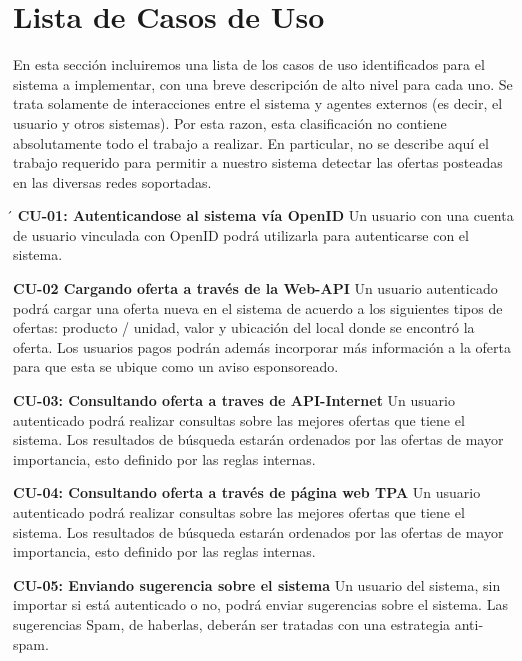 \section*{Lista de Casos de Uso}
 En esta sección incluiremos una lista de los casos de uso identificados para el sistema a implementar, con una breve descripción de alto nivel para cada uno. Se trata solamente de interacciones entre el sistema y agentes externos (es decir, el usuario y otros sistemas). Por esta razon, esta clasificación no contiene absolutamente todo el trabajo a realizar.  
    En particular, no se describe aquí el trabajo requerido para permitir a nuestro sistema detectar las ofertas posteadas en las diversas redes soportadas. 


 ́ 
\textbf{CU-01: Autenticandose al sistema vía OpenID} Un usuario con una cuenta de usuario vinculada con OpenID podrá utilizarla para autenticarse con el sistema.

\textbf{CU-02 Cargando oferta a través de la Web-API} Un usuario autenticado podrá cargar una oferta nueva en el sistema de acuerdo a los siguientes tipos de ofertas: producto / unidad, valor y ubicación del local donde se encontró la oferta. Los usuarios pagos podrán además incorporar más información a la oferta para que esta se ubique como un aviso esponsoreado.

\textbf{CU-03: Consultando oferta a traves de API-Internet} Un usuario autenticado podrá realizar consultas sobre las mejores ofertas que tiene el sistema. Los resultados de búsqueda estarán ordenados por las ofertas de mayor importancia, esto definido por las reglas internas.

\textbf{CU-04: Consultando oferta a través de página web TPA} Un usuario autenticado podrá realizar consultas sobre las mejores ofertas que tiene el sistema. Los resultados de búsqueda estarán ordenados por las ofertas de mayor importancia, esto definido por las reglas internas.

\textbf{CU-05: Enviando sugerencia sobre el sistema} Un usuario del sistema, sin importar si está autenticado o no, podrá enviar sugerencias sobre el sistema. Las sugerencias Spam, de haberlas, deberán ser tratadas con una estrategia anti-spam.
